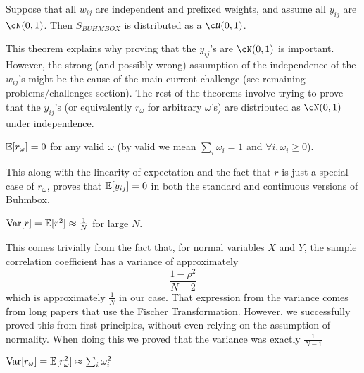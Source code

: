 \documentclass[11pt]{hw-template}
\begin{document}
  \begin{theorem}
    Suppose that all $w_{ij}$ are independent and prefixed weights, and assume all $y_{ij}$ are $\cN(0, 1)$. Then $S_{BUHMBOX}$ is distributed as a $\cN(0, 1)$.
  \end{theorem}

  \begin{remark}
    This theorem explains why proving that the $y_{ij}$'s are $\cN(0, 1)$ is important. However, the strong (and possibly wrong) assumption of the independence of the $w_{ij}$'s might be the cause of the main
    current challenge (see remaining problems/challenges section). The rest of the theorems involve trying to prove that the $y_{ij}$'s (or equivalently $r_\omega$ for arbitrary $\omega$'s) are distributed
    as $\cN(0, 1)$ under independence. 
  \end{remark}



  \begin{theorem}
    $\operatorname{\mathbb{E}}[r_\omega] = 0$ for any valid $\omega$ (by valid we mean $\sum_i \omega_i = 1$ and $\forall i, \omega_i \geq 0$).
  \end{theorem}

  \begin{remark}
    This along with the linearity of expectation and the fact that $r$ is just a special case of $r_\omega$, proves that $\operatorname{\mathbb{E}}[y_{ij}] = 0$ in both the standard and continuous versions of Buhmbox.
  \end{remark}


  \begin{theorem}
    $\operatorname{Var}[r] = \operatorname{\mathbb{E}}[r^2] \approx \frac{1}{N}$ for large $N$.
  \end{theorem}

  \begin{remark}
    This comes trivially from the fact that, for normal variables $X$ and $Y$, the sample correlation coefficient has a variance of approximately $$\frac{1 - \rho^2}{N - 2}$$ which is approximately $\frac{1}{N}$
    in our case. That expression from the variance comes from long papers that use the Fischer Transformation. However, we successfully proved this from first principles, without even relying on the assumption
    of normality. When doing this we proved that the variance was exactly $\frac{1}{N-1}$ 
  \end{remark}

  \begin{conjecture}
    $\operatorname{Var}[r_\omega] = \operatorname{\mathbb{E}}[r_\omega^2] \approx \sum_i \omega_i^2$
  \end{conjecture}
\end{document}

